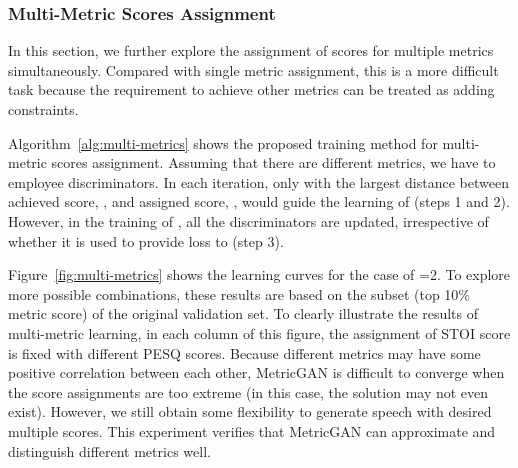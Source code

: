 \documentclass{article}
\begin{document}
\subsubsection{Multi-Metric Scores Assignment}
In this section, we further explore the assignment of scores for multiple metrics simultaneously. Compared with single metric assignment, this is a more difficult task because the requirement to achieve other metrics can be treated as adding constraints.


Algorithm~\ref{alg:multi-metrics} shows the proposed training method for multi-metric scores assignment. Assuming that there are  different metrics, we have to employee  discriminators. In each iteration, only  with the largest distance between achieved score, , and assigned score, , would guide the learning of  (steps 1 and 2). However, in the training of , all the discriminators  are updated, irrespective of whether it is used to provide loss to  (step 3). 

Figure~\ref{fig:multi-metrics} shows the learning curves for the case of =2. To explore more possible combinations, these results are based on the subset (top 10\% metric score) of the original validation set. To clearly illustrate the results of multi-metric learning, in each column of this figure, the assignment of STOI score is fixed with different PESQ scores. Because different metrics may have some positive correlation between each other, MetricGAN is difficult to converge when the score assignments are too extreme (in this case, the solution may not even exist). However, we still obtain some flexibility to generate speech with desired multiple scores. This experiment verifies that MetricGAN can approximate and distinguish different metrics well. 
\end{document}
